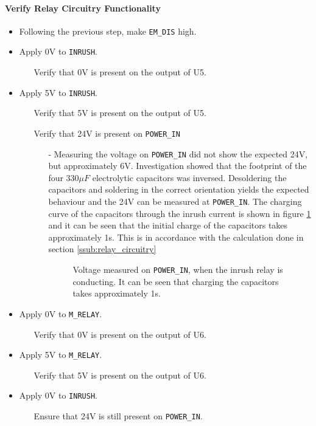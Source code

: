 \paragraph{Verify Relay Circuitry Functionality} %
\label{par:verify_relay_circuitry}
\begin{itemize}
	\item Following the previous step, make \texttt{EM\_DIS} high.
	\item Apply 0V to \texttt{INRUSH}.
	\begin{itemize}
		\item[\cmark] Verify that 0V is present on the output of U5.
	\end{itemize}
	\item Apply 5V to \texttt{INRUSH}.
	\begin{itemize}
		\item[\cmark] Verify that 5V is present on the output of U5.
		\item[\xmark] Verify that 24V is present on \texttt{POWER\_IN}
		\begin{itemize}
			\item[-]  Measuring the voltage on \texttt{POWER\_IN} did not show the expected 24V, but approximately 6V. 
			Investigation showed that the footprint of the four $330 \mu F$ electrolytic capacitors was inversed. 
			Desoldering the capacitors and soldering in the correct orientation yields the expected behaviour and the 24V can be measured at \texttt{POWER\_IN}.
			The charging curve of the capacitors through the inrush current is shown in figure 
			\ref{fig:controllerboardv2_inrushcurrent_charge} and it can be seen that the initial charge of the capacitors takes approximately 1s.
			This is in accordance with the calculation done in section \ref{ssub:relay_circuitry}

			\begin{figure}[h]
				\centering
			    
				\caption[Chargin curve of Capacitor bank.]{Voltage measured on \texttt{POWER\_IN}, when the inrush relay is conducting. It can be seen that charging the capacitors takes approximately 1s. }
				\label{fig:controllerboardv2_inrushcurrent_charge}
			\end{figure}
 
		\end{itemize}
	\end{itemize}
	\item Apply 0V to \texttt{M\_RELAY}.
	\begin{itemize}
		\item[\cmark] Verify that 0V is present on the output of U6.
	\end{itemize}
	\item Apply 5V to \texttt{M\_RELAY}.
	\begin{itemize}
		\item[\cmark] Verify that 5V is present on the output of U6.
	\end{itemize}
	\item Apply 0V to \texttt{INRUSH}.
	\begin{itemize}
		\item[\cmark] Ensure that 24V is still present on \texttt{POWER\_IN}.
	\end{itemize}
\end{itemize}
